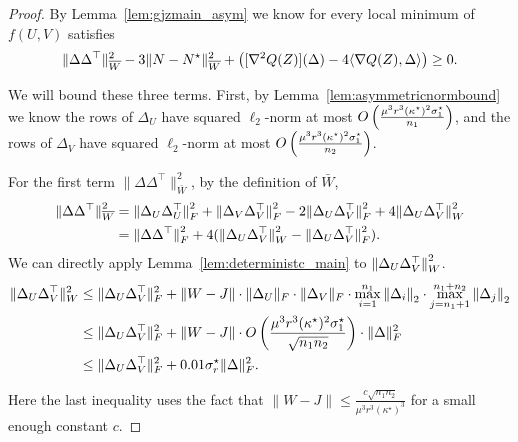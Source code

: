 \begin{proof}
By Lemma~\ref{lem:gjzmain_asym} we know for every local minimum of $f(U,V)$ satisfies
\[
\|\Delta\Delta^\top\|_{\overline{W}}^2 - 3\|N - N^\star\|_{\overline{W}}^2 + \left([\nabla^2 Q(Z)](\Delta) - 4\langle \nabla Q(Z), \Delta\rangle\right) \ge 0.
\]

We will bound these three terms. First, by Lemma~\ref{lem:asymmetricnormbound} we know the rows of $\Delta_U$ have squared $\ell_2$-norm at most $ O\left(\frac{\mu^3 r^3 (\kappa^\star)^2 \sigma^\star_1}{n_1}\right)$, and the rows of $\Delta_V$ have squared $\ell_2$-norm at most $ O\left(\frac{\mu^3 r^3 (\kappa^\star)^2 \sigma^\star_1}{n_2}\right)$.

For the first term $\|\Delta\Delta^\top\|_{\bar{W}}^2$, by the definition of $\bar W$,
\begin{align*}
\lVert\Delta \Delta^\top{\rVert}_{\overline W}^2 & = \lVert\Delta_U \Delta_U^\top{\rVert}_F^2 + \lVert\Delta_V \Delta_V^\top{\rVert}_F^2 - 2 \lVert\Delta_U \Delta_V^\top{\rVert}_F^2 + 4 \lVert\Delta_U \Delta_V^\top{\rVert}_W^2 \\
  & = \lVert\Delta \Delta^\top{\rVert}_{F}^2 + 4(\lVert\Delta_U \Delta_V^\top{\rVert}_W^2 - \lVert\Delta_U \Delta_V^\top{\rVert}_F^2).
\end{align*}
We can directly apply Lemma~\ref{lem:deterministc_main} to $\lVert\Delta_U \Delta_V^\top{\rVert}_W^2$.
\begin{align*}
\|\Delta_U\Delta_V^\top\|_W^2 & \le \|\Delta_U\Delta_V^\top\|_F^2 + \|W-J\| \cdot \|\Delta_U\|_F \cdot \|\Delta_V\|_F \cdot \max_{i=1}^{n_1} {\lVert\Delta_i{\rVert}}_2 \cdot \max_{j=n_1+1}^{n_1+n_2} {\lVert\Delta_j{\rVert}}_2 \\
& \le \|\Delta_U\Delta_V^\top\|_F^2 + \|W-J\|\cdot O\left(\frac{\mu^3 r^3 (\kappa^\star)^2 \sigma^\star_1}{\sqrt{n_1n_2}}\right)\cdot \|\Delta\|_F^2 \\
& \le \|\Delta_U\Delta_V^\top\|_F^2 + 0.01\sigma^\star_r \|\Delta\|_F^2.
\end{align*}

Here the last inequality uses the fact that $\|W-J\| \le \frac{c\sqrt{n_1n_2}}{\mu^3 r^3 (\kappa^\star)^3}$ for a small enough constant $c$. 


\end{proof}
